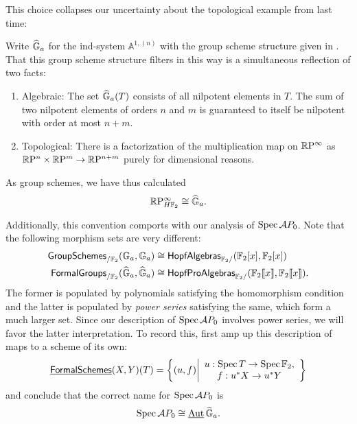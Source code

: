 This choice collapses our uncertainty about the topological example from last time:
\begin{example}\label{RPinftyExampleForReal}
Write $\widehat{\mathbb G}_a$ for the ind-system $\mathbb A^{1, (n)}$ with the group scheme structure given in .  That this group scheme structure filters in this way is a simultaneous reflection of two facts:
\begin{enumerate}
\item Algebraic: The set $\widehat{\mathbb G}_a(T)$ consists of all nilpotent elements in $T$.  The sum of two nilpotent elements of orders $n$ and $m$ is guaranteed to itself be nilpotent with order at most $n+m$.
\item Topological: There is a factorization of the multiplication map on $\mathbb R\mathrm P^\infty$ as $\mathbb R\mathrm P^n \times \mathbb R\mathrm P^m \to \mathbb R\mathrm P^{n+m}$ purely for dimensional reasons.
\end{enumerate}
As group schemes, we have thus calculated \[\mathbb R\mathrm P^\infty_{H\mathbb F_2} \cong \widehat{\mathbb G}_a.\]
\end{example}

\begin{example}
Additionally, this convention comports with our analysis of $\operatorname{Spec} \mathcal AP_0$.  Note that the following morphism sets are very different:
\begin{align*}
\mathsf{GroupSchemes}_{/\mathbb F_2}(\mathbb G_a, \mathbb G_a) & \cong \mathsf{HopfAlgebras}_{\mathbb F_2/}(\mathbb F_2[x], \mathbb F_2[x]) \\
\mathsf{FormalGroups}_{/\mathbb F_2}(\widehat{\mathbb G}_a, \widehat{\mathbb G}_a) & \cong \mathsf{HopfProAlgebras}_{\mathbb F_2/}(\mathbb F_2\llbracket x \rrbracket, \mathbb F_2\llbracket x \rrbracket).
\end{align*}
The former is populated by polynomials satisfying the homomorphism condition and the latter is populated by \emph{power series} satisfying the same, which form a much larger set.  Since our description of $\operatorname{Spec} \mathcal AP_0$ involves power series, we will favor the latter interpretation.  To record this, first amp up this description of maps to a scheme of its own: \[\operatorname{\underline{\smash{\mathsf{FormalSchemes}}}}(X, Y)(T) = \left\{ (u, f) \middle| \begin{array}{c} u: \operatorname{Spec} T \to \operatorname{Spec} \mathbb F_2, \\ f: u^* X \to u^* Y \end{array}\right\}\] and conclude that the correct name for $\operatorname{Spec} \mathcal AP_0$ is \[\operatorname{Spec} \mathcal AP_0 \cong \operatorname{\underline{\smash{\operatorname{Aut}}}} \widehat{\mathbb G}_a.\]
\end{example}

